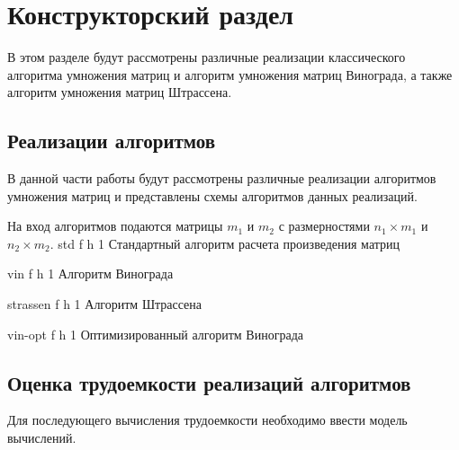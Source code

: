 \chapter{Конструкторский раздел}



В этом разделе будут рассмотрены различные реализации классического алгоритма умножения матриц и алгоритм умножения матриц
Винограда, а также алгоритм умножения матриц Штрассена.


\section{Реализации алгоритмов}

В данной части работы будут рассмотрены различные реализации алгоритмов
умножения матриц и представлены схемы алгоритмов данных реализаций.

На вход алгоритмов подаются матрицы $m_{1}$ и $m_{2}$ с размерностями $n_{1}\times m_{1}$ и $n_{2}\times m_{2}$.
{std} %
{f} %
{h} %
{1\textwidth} %
{Стандартный алгоритм расчета произведения матриц} %

{vin} %
{f} %
{h} %
{1\textwidth} %
{Алгоритм Винограда} %

{strassen} %
{f} %
{h} %
{1\textwidth} %
{Алгоритм Штрассена} %

{vin-opt} %
{f} %
{h} %
{1\textwidth} %
{Оптимизированный алгоритм Винограда} %




\section{Оценка трудоемкости реализаций алгоритмов}

Для последующего вычисления трудоемкости необходимо ввести модель вычислений.

